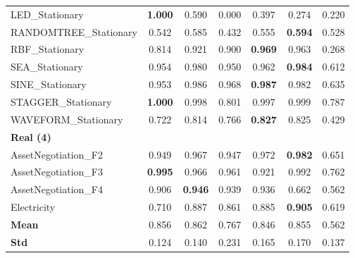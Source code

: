 \begin{table}[ht]
\begin{tabular}{l|cccccc}
LED\_Stationary & \textbf{1.000} & 0.590 & 0.000 & 0.397 & 0.274 & 0.220 \\
RANDOMTREE\_Stationary & 0.542 & 0.585 & 0.432 & 0.555 & \textbf{0.594} & 0.528 \\
RBF\_Stationary & 0.814 & 0.921 & 0.900 & \textbf{0.969} & 0.963 & 0.268 \\
SEA\_Stationary & 0.954 & 0.980 & 0.950 & 0.962 & \textbf{0.984} & 0.612 \\
SINE\_Stationary & 0.953 & 0.986 & 0.968 & \textbf{0.987} & 0.982 & 0.635 \\
STAGGER\_Stationary & \textbf{1.000} & 0.998 & 0.801 & 0.997 & 0.999 & 0.787 \\
WAVEFORM\_Stationary & 0.722 & 0.814 & 0.766 & \textbf{0.827} & 0.825 & 0.429 \\
\multicolumn{7}{l}{\textbf{Real (4)}} \\
AssetNegotiation\_F2 & 0.949 & 0.967 & 0.947 & 0.972 & \textbf{0.982} & 0.651 \\
AssetNegotiation\_F3 & \textbf{0.995} & 0.966 & 0.961 & 0.921 & 0.992 & 0.762 \\
AssetNegotiation\_F4 & 0.906 & \textbf{0.946} & 0.939 & 0.936 & 0.662 & 0.562 \\
Electricity & 0.710 & 0.887 & 0.861 & 0.885 & \textbf{0.905} & 0.619 \\
\midrule
\textbf{Mean} & 0.856 & 0.862 & 0.767 & 0.846 & 0.855 & 0.562 \\
\textbf{Std} & 0.124 & 0.140 & 0.231 & 0.165 & 0.170 & 0.137 \\
\bottomrule
\end{tabular}
\end{table}